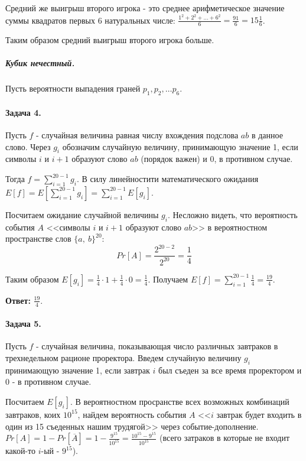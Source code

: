 \documentclass{article}
\begin{document}
    Средний же выигрыш второго игрока - это среднее арифметическое значение суммы квадратов первых 6 натуральных числе: $\frac{1^2 + 2^2 + \ldots + 6^2}{6} = \frac{91}{6} = 15\frac{1}{6}$.

    Таким образом средний выигрыш второго игрока больше.

    \subparagraph{Кубик нечестный.}
    Пусть вероятности выпадения граней $p_1, p_2, \ldots p_6$.


    \paragraph{Задача 4.}
    Пусть $f$ - случайная величина равная числу вхождения подслова $ab$ в данное слово. Через $g_i$ обозначим случайную величину, принимающую значение 1, если символы $i$ и $i + 1$ образуют слово $ab$ (порядок важен) и 0, в противном случае.

    Тогда $f = \sum_{i=1}^{20 - 1} g_i$. В силу линейностити математического ожидания $E[f] = E[\sum_{i=1}^{20 - 1} g_i] = \sum_{i=1}^{20 - 1} E[g_i]$. 

    Посчитаем ожидание случайной величины $g_i$. Несложно видеть, что вероятность события $A$ <<символы $i$ и $i + 1$ образуют слово $ab$>> в вероятностном пространстве слов $\{a,\ b\}^20$:
    $$Pr[A] = \frac{2^{20 - 2}}{2^{20}} = \frac{1}{4}$$

    Таким образом $E[g_i] = \frac{1}{4} \cdot 1 + \frac{1}{4} \cdot 0 = \frac{1}{4}$.
    Получаем $E[f] = \sum_{i=1}^{20 - 1} \frac{1}{4} = \frac{19}{4}$.

    \textbf{Ответ:} $\frac{19}{4}$.

    \paragraph{Задача 5.}
    Пусть $f$ - случайная величина, показывающая число различных завтраков в трехнедельном рационе проректора. Введем случайную величину $g_i$ принимающую значение 1, если завтрак $i$ был съеден за все время проректором и 0 - в противном случае.

    Посчитаем $E[g_i]$. В вероятностном просранстве всех возможных комбинаций завтраков, коих $10^{15}$, найдем вероятность события $A$ <<$i$ завтрак будет входить в один из 15 съеденных нашим трудягой>> через событие-дополнение. $Pr[A] = 1 - Pr[\overline{A}] = 1 - \frac{9^{15}}{10^{15}} = \frac{10^{15} - 9^{15}}{10^{15}}$ (всего затраков в которые не входит какой-то $i$-ый - $9^{15}$).
\end{document}
